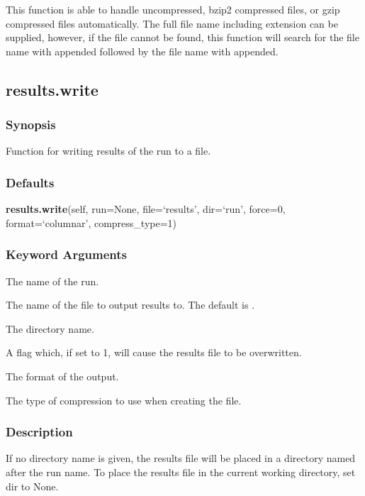 This function is able to handle uncompressed, bzip2 compressed files, or gzip compressed
files automatically.  The full file name including extension can be supplied, however, if
the file cannot be found, this function will search for the file name with 
 appended
followed by the file name with 
 appended.


\newpage

\subsection{results.write}


\subsubsection{Synopsis}

Function for writing results of the run to a file.

\subsubsection{Defaults}

\textsf{\textbf{results.write}(self, run=None, file=`results', dir=`run', force=0, format=`columnar', compress\_type=1)}


\subsubsection{Keyword Arguments}


  The name of the run.

  The name of the file to output results to.  The default is 
.

  The directory name.

  A flag which, if set to 1, will cause the results file to be overwritten.

  The format of the output.

  The type of compression to use when creating the file.

\subsubsection{Description}

If no directory name is given, the results file will be placed in a directory named after
the run name.  To place the results file in the current working directory, set dir to None.

